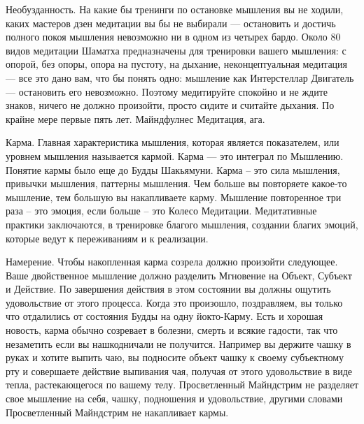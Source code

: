 Необузданность. На какие бы тренинги по остановке мышления вы не ходили, каких мастеров дзен медитации вы бы не выбирали — остановить и достичь полного покоя мышления невозможно ни в одном из четырех бардо. Около 80 видов медитации Шаматха предназначены для тренировки вашего мышления: с опорой, без опоры, опора на пустоту, на дыхание, неконцептуальная  медитация — все это дано вам, что бы понять одно: мышление как Интерстеллар Двигатель — остановить его невозможно. Поэтому медитируйте спокойно и не ждите знаков, ничего не должно произойти, просто сидите и считайте дыхания. По крайне мере первые пять лет. Майндфулнес Медитация, ага.

Карма. Главная характеристика мышления, которая является показателем, или уровнем мышления называется кармой. Карма — это интеграл по Мышлению. Понятие кармы было еще до Будды Шакьямуни. Карма – это сила мышления, привычки мышления, паттерны мышления. Чем больше вы повторяете какое-то мышление, тем большую вы накапливаете карму. Мышление повторенное три раза – это эмоция, если больше – это Колесо Медитации. Медитативные практики заключаются, в тренировке благого мышления, создании благих эмоций, которые ведут к переживаниям и к реализации.

Намерение. Чтобы накопленная карма созрела должно произойти следующее. Ваше двойственное мышление должно разделить Мгновение на Объект, Субъект и Действие. По завершения действия в этом состоянии вы должны ощутить удовольствие от этого процесса. Когда это произошло, поздравляем, вы только что отдалились от состояния Будды на одну йокто-Карму. Есть и хорошая новость, карма обычно созревает в болезни, смерть и всякие гадости, так что незаметить если вы нашкодничали не получится. Например вы держите чашку в руках и хотите выпить чаю, вы подносите объект чашку к своему субъектному рту и совершаете действие выпивания чая, получая от этого удовольствие в виде тепла, растекающегося по вашему телу. Просветленный Майндстрим не разделяет свое мышление на себя, чашку, подношения и удовольствие, другими словами Просветленный Майндстрим не накапливает кармы.

